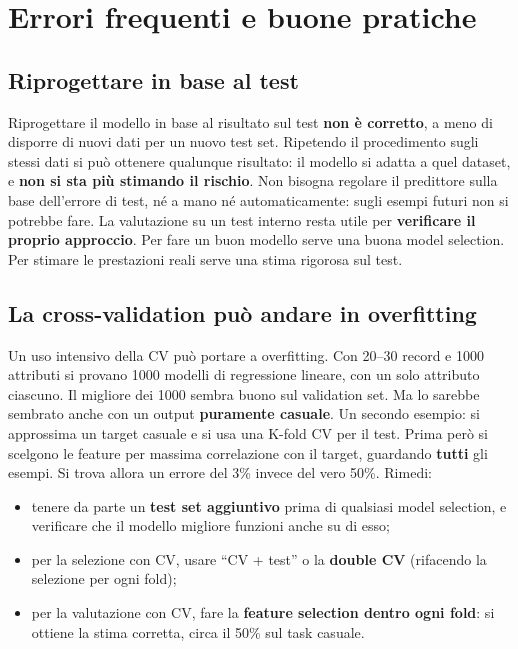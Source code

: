 \section{Errori frequenti e buone pratiche}
\label{sec:errori-validazione}

\subsection{Riprogettare in base al test}
Riprogettare il modello in base al risultato sul test \textbf{non è corretto}, a meno di disporre di nuovi dati
per un nuovo test set. Ripetendo il procedimento sugli stessi dati si può ottenere qualunque risultato: il
modello si adatta a quel dataset, e \textbf{non si sta più stimando il rischio}. Non bisogna regolare il
predittore sulla base dell'errore di test, né a mano né automaticamente: sugli esempi futuri non si potrebbe
fare. La valutazione su un test interno resta utile per \textbf{verificare il proprio approccio}. Per fare un buon
modello serve una buona model selection. Per stimare le prestazioni reali serve una stima rigorosa sul test.

\subsection{La cross-validation può andare in overfitting}
Un uso intensivo della CV può portare a overfitting. Con 20--30 record e 1000 attributi si provano 1000 modelli
di regressione lineare, con un solo attributo ciascuno. Il migliore dei 1000 sembra buono sul validation set. Ma
lo sarebbe sembrato anche con un output \textbf{puramente casuale}. Un secondo esempio: si approssima un target
casuale e si usa una K-fold CV per il test. Prima però si scelgono le feature per massima correlazione con il
target, guardando \textbf{tutti} gli esempi. Si trova allora un errore del 3\% invece del vero 50\%. Rimedi:
\begin{itemize}
  \item tenere da parte un \textbf{test set aggiuntivo} prima di qualsiasi model selection, e verificare che il
        modello migliore funzioni anche su di esso;
  \item per la selezione con CV, usare ``CV + test'' o la \textbf{double CV} (rifacendo la selezione per ogni fold);
  \item per la valutazione con CV, fare la \textbf{feature selection dentro ogni fold}: si ottiene la stima
        corretta, circa il 50\% sul task casuale.
\end{itemize}

